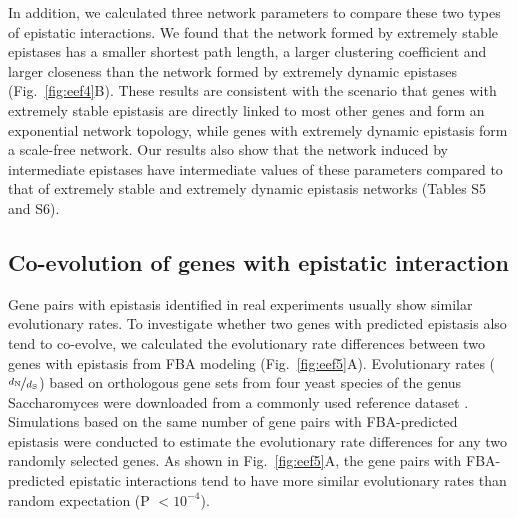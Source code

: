 \documentclass[10pt]{article}
\newcommand{\Fig}{Fig.}
\newcommand{\citep}{\cite}
\begin{document}

In addition, we calculated three network parameters to compare these
two types of epistatic interactions. We found that the network formed
by extremely stable epistases has a smaller shortest path length, a
larger clustering coefficient and larger closeness than the network
formed by extremely dynamic epistases (\Fig~\ref{fig:eef4}B). These results are
consistent with the scenario that genes with extremely stable
epistasis are directly linked to most other genes and form an
exponential network topology, while genes with extremely dynamic
epistasis form a scale-free network. Our results also show that the
network induced by intermediate epistases have intermediate values of
these parameters compared to that of extremely stable and extremely
dynamic epistasis networks (Tables S5 and S6).

\subsection*{Co-evolution of genes with epistatic interaction}

Gene pairs with epistasis identified in real experiments usually show
similar evolutionary rates. To investigate whether two genes with
predicted epistasis also tend to co-evolve, we calculated the
evolutionary rate differences between two genes with epistasis from
FBA modeling (\Fig~\ref{fig:eef5}A). Evolutionary rates
($\nicefrac{d_\textnormal{N}}{d_\textnormal{S}}$) based on orthologous
gene sets
from four yeast species of the genus Saccharomyces were downloaded
from a commonly used reference dataset \citep{Wall2005}. Simulations
based on the same number of gene pairs with FBA-predicted epistasis
were conducted to estimate the evolutionary rate differences for any
two randomly selected genes. As shown in \Fig~\ref{fig:eef5}A, the gene pairs
with FBA-predicted epistatic interactions tend to have more similar
evolutionary rates than random expectation (P $< 10^{-4}$).


\end{document}
